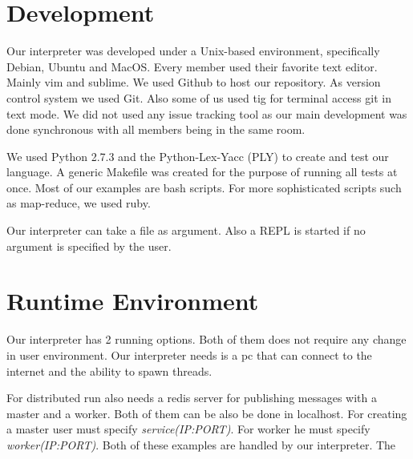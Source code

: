 \section{Development}
Our interpreter was developed under a Unix-based environment, specifically Debian, Ubuntu and MacOS.
Every member used their favorite text editor. Mainly vim and sublime. We used Github to host our
repository. As version control system we used Git. Also some of us used tig for terminal access git in
text mode. We did not used any issue tracking tool as 
our main development was done synchronous with all members being in the same room.

We used Python 2.7.3 and the Python-Lex-Yacc (PLY) to create and test our language. A generic Makefile
was created for the purpose of running all tests at once. Most of our examples are bash scripts.
For more sophisticated scripts such as map-reduce, we used ruby.

Our interpreter can take a file as argument. Also a REPL is started if no argument
is specified by the user.

\section{Runtime Environment}
Our interpreter has 2 running options. Both of them does not require any change in user environment.
Our interpreter needs is a pc that can connect to the internet and the ability to spawn threads. 

For distributed run also needs a redis server for publishing messages with a master and a worker. Both of them can be also 
be done in localhost.
For creating a master user must specify \textit{service(IP:PORT)}. For worker he must
specify \textit{worker(IP:PORT)}. Both of these examples are handled by our interpreter.
The 
